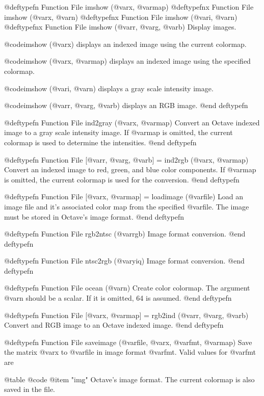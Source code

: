 @deftypefn {Function File} {} imshow (@var{x}, @var{map})
@deftypefnx {Function File} {} imshow (@var{x}, @var{n})
@deftypefnx {Function File} {} imshow (@var{i}, @var{n})
@deftypefnx {Function File} {} imshow (@var{r}, @var{g}, @var{b})
Display images.

@code{imshow (@var{x})} displays an indexed image using the current
colormap.

@code{imshow (@var{x}, @var{map})} displays an indexed image using the
specified colormap.

@code{imshow (@var{i}, @var{n})} displays a gray scale intensity image.

@code{imshow (@var{r}, @var{g}, @var{b})} displays an RGB image.
@end deftypefn

@deftypefn {Function File} {} ind2gray (@var{x}, @var{map})
Convert an Octave indexed image to a gray scale intensity image.
If @var{map} is omitted, the current colormap is used to determine the
intensities.
@end deftypefn

@deftypefn {Function File} {[@var{r}, @var{g}, @var{b}] =} ind2rgb (@var{x}, @var{map})
Convert an indexed image to red, green, and blue color components.
If @var{map} is omitted, the current colormap is used for the conversion.
@end deftypefn

@deftypefn {Function File} {[@var{x}, @var{map}] =} loadimage (@var{file})
Load an image file and it's associated color map from the specified
@var{file}.  The image must be stored in Octave's image format.
@end deftypefn

@deftypefn {Function File} {} rgb2ntsc (@var{rgb})
Image format conversion.
@end deftypefn

@deftypefn {Function File} {} ntsc2rgb (@var{yiq})
Image format conversion.
@end deftypefn

@deftypefn {Function File} {} ocean (@var{n})
Create color colormap.  The argument @var{n} should be a scalar.  If it
is omitted, 64 is assumed.
@end deftypefn

@deftypefn {Function File} {[@var{x}, @var{map}] =} rgb2ind (@var{r}, @var{g}, @var{b})
Convert and RGB image to an Octave indexed image.
@end deftypefn

@deftypefn {Function File} {} saveimage (@var{file}, @var{x}, @var{fmt}, @var{map})
Save the matrix @var{x} to @var{file} in image format @var{fmt}.  Valid
values for @var{fmt} are

@table @code
@item "img"
Octave's image format.  The current colormap is also saved in the file.

